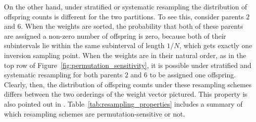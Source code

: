 On the other hand, under stratified or systematic resampling the distribution of offspring counts is different for the two partitions. 
To see this, consider parents $2$ and $6$. When the weights are sorted, the probability that both of these parents are assigned a non-zero number of offspring is zero, because both of their subintervals lie within the same subinterval of length $1/N$, which gets exactly one inversion sampling point.
When the weights are in their natural order, as in the top row of Figure~\ref{fig:permutation_sensitivity}, it is possible under stratified and systematic resampling for both parents $2$ and $6$ to be assigned one offspring.
Clearly, then, the distribution of offspring counts under these resampling schemes differs between the two orderings of the weight vector pictured. 
This property is also pointed out in \textcite[p.66]{douc2005}.
Table~\ref{tab:resampling_properties} includes a summary of which resampling schemes are permutation-sensitive or not.
%
%

